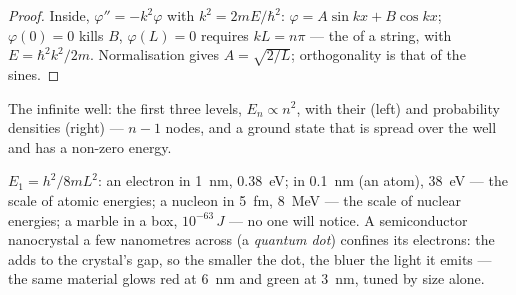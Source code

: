 \begin{proof}
Inside, $\varphi'' = -k^2\varphi$ with $k^2 = 2mE/\hbar^2$: $\varphi = A\sin kx
+ B\cos kx$; $\varphi(0) = 0$ kills $B$, $\varphi(L) = 0$ requires $kL = n\pi$
--- the  of a string, with $E = \hbar^2k^2/2m$.
Normalisation gives $A = \sqrt{2/L}$; orthogonality is that of the
sines.
\end{proof}

\begin{omfigure}

{\small The infinite well: the first three levels, $E_n \propto n^2$,
with their  (left) and probability densities (right) ---
$n - 1$ nodes, and a ground state that is spread over the well and
has a non-zero energy.}
\end{omfigure}

\begin{example}\label{ex:b2:potential-wells-tunneling:orders}
$E_1 = h^2/8mL^2$: an electron in \qty{1}{nm}, \qty{0.38}{eV}; in
\qty{0.1}{nm} (an atom), \qty{38}{eV} --- the scale of atomic energies; a
nucleon in \qty{5}{fm}, \qty{8}{MeV} --- the scale of nuclear energies; a
marble in a box, $10^{-63}\,\unit{J}$ --- no one will notice. A
semiconductor nanocrystal a few nanometres across (a \emph{quantum
dot}) confines its electrons: the  adds to the
crystal's gap, so the smaller the dot, the bluer the light it emits ---
the same material glows red at \qty{6}{nm} and green at \qty{3}{nm},
tuned by size alone.
\end{example}

